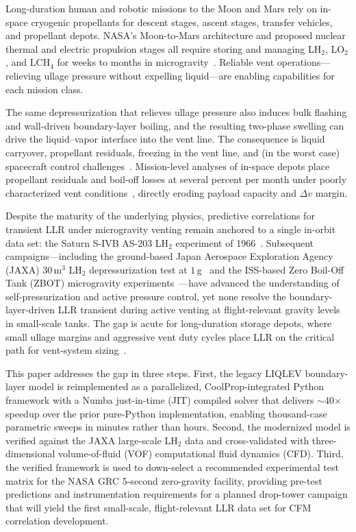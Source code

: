 \documentclass[conf]{new-aiaa}
\begin{document}
Long-duration human and robotic missions to the Moon and Mars rely on in-space cryogenic propellants for descent stages, ascent stages, transfer vehicles, and propellant depots. NASA's Moon-to-Mars architecture and proposed nuclear thermal and electric propulsion stages all require storing and managing LH$_2$, LO$_2$, and LCH$_4$ for weeks to months in microgravity~\cite{Meyer2019, Hartwig2015}. Reliable vent operations---relieving ullage pressure without expelling liquid---are enabling capabilities for each mission class.

The same depressurization that relieves ullage pressure also induces bulk flashing and wall-driven boundary-layer boiling, and the resulting two-phase swelling can drive the liquid--vapor interface into the vent line. The consequence is liquid carryover, propellant residuals, freezing in the vent line, and (in the worst case) spacecraft control challenges~\cite{Hastings2003, Hartwig2015}. Mission-level analyses of in-space depots place propellant residuals and boil-off losses at several percent per month under poorly characterized vent conditions~\cite{Plachta2014, Meyer2019}, directly eroding payload capacity and $\Delta v$ margin.

Despite the maturity of the underlying physics, predictive correlations for transient LLR under microgravity venting remain anchored to a single in-orbit data set: the Saturn S-IVB AS-203 LH$_2$ experiment of 1966~\cite{AS203_1970}. Subsequent campaigns---including the ground-based Japan Aerospace Exploration Agency (JAXA) $30\,\text{m}^3$ LH$_2$ depressurization test at $1\,$g~\cite{tani2021pressure} and the ISS-based Zero Boil-Off Tank (ZBOT) microgravity experiments~\cite{Kassemi2018}---have advanced the understanding of self-pressurization and active pressure control, yet none resolve the boundary-layer-driven LLR transient during active venting at flight-relevant gravity levels in small-scale tanks. The gap is acute for long-duration storage depots, where small ullage margins and aggressive vent duty cycles place LLR on the critical path for vent-system sizing~\cite{NASA80NSSC24K1219}.

This paper addresses the gap in three steps. First, the legacy LIQLEV boundary-layer model is reimplemented as a parallelized, CoolProp-integrated Python framework with a Numba just-in-time (JIT) compiled solver that delivers $\sim$40$\times$ speedup over the prior pure-Python implementation, enabling thousand-case parametric sweeps in minutes rather than hours. Second, the modernized model is verified against the JAXA large-scale LH$_2$ data and cross-validated with three-dimensional volume-of-fluid (VOF) computational fluid dynamics (CFD). Third, the verified framework is used to down-select a recommended experimental test matrix for the NASA GRC 5-second zero-gravity facility, providing pre-test predictions and instrumentation requirements for a planned drop-tower campaign that will yield the first small-scale, flight-relevant LLR data set for CFM correlation development.
\end{document}
